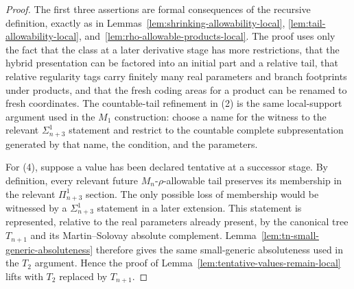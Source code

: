 \documentclass[a4paper,11pt]{article}
\begin{document}
\begin{proof}
The first three assertions are formal consequences of the recursive definition, exactly as in Lemmas~\ref{lem:shrinking-allowability-local}, \ref{lem:tail-allowability-local}, and~\ref{lem:rho-allowable-products-local}.  The proof uses only the fact that the class at a later derivative stage has more restrictions, that the hybrid presentation can be factored into an initial part and a relative tail, that relative regularity tags carry finitely many real parameters and branch footprints under products, and that the fresh coding areas for a product can be renamed to fresh coordinates.  The countable-tail refinement in (2) is the same local-support argument used in the $M_1$ construction: choose a name for the witness to the relevant $\Sigma^1_{n+3}$ statement and restrict to the countable complete subpresentation generated by that name, the condition, and the parameters.

For (4), suppose a value has been declared tentative at a successor stage.  By definition, every relevant future $M_n$-$\rho$-allowable tail preserves its membership in the relevant $\Pi^1_{n+3}$ section.  The only possible loss of membership would be witnessed by a $\Sigma^1_{n+3}$ statement in a later extension.  This statement is represented, relative to the real parameters already present, by the canonical tree $T_{n+1}$ and its Martin--Solovay absolute complement.  Lemma~\ref{lem:tn-small-generic-absoluteness} therefore gives the same small-generic absoluteness used in the $T_2$ argument.  Hence the proof of Lemma~\ref{lem:tentative-values-remain-local} lifts with $T_2$ replaced by $T_{n+1}$.
\end{proof}
\end{document}
